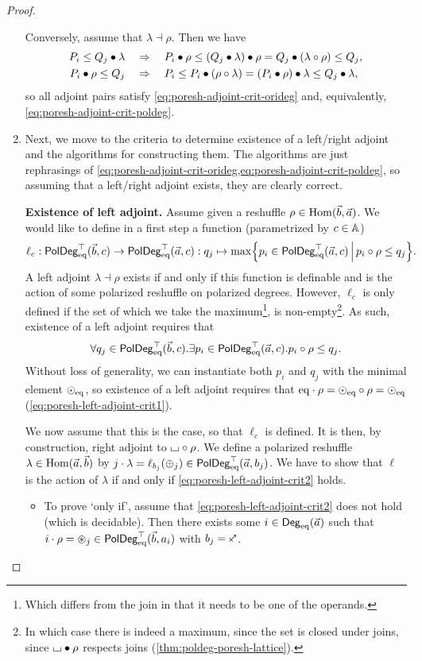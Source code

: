 \documentclass[a4paper]{memoir}
\begin{document}
\begin{proof}
\begin{enumerate}
		Conversely, assume that $\lambda \dashv \rho$. Then we have
		\begin{align*}
			P_i \leq Q_j \mathbin{\bullet} \lambda &\quad\Rightarrow\quad P_i \mathbin{\bullet} \rho \leq (Q_j \mathbin{\bullet} \lambda) \mathbin{\bullet} \rho = Q_j \mathbin{\bullet} (\lambda \circ \rho) \leq Q_j, \\
			P_i \mathbin{\bullet} \rho \leq Q_j &\quad\Rightarrow\quad P_i \leq P_i \mathbin{\bullet} (\rho \circ \lambda) = (P_i \mathbin{\bullet} \rho) \mathbin{\bullet} \lambda \leq Q_j \mathbin{\bullet} \lambda,
		\end{align*}
		so all adjoint pairs satisfy \cref{eq:poresh-adjoint-crit-orideg} and, equivalently, \cref{eq:poresh-adjoint-crit-poldeg}.
		
		\item Next, we move to the criteria to determine existence of a left/right adjoint and the algorithms for constructing them.
		The algorithms are just rephrasings of \cref{eq:poresh-adjoint-crit-orideg,eq:poresh-adjoint-crit-poldeg}, so assuming that a left/right adjoint exists, they are clearly correct.
		
		\textbf{Existence of left adjoint.} Assume given a reshuffle $\rho \in {\mathrm{Hom}}(\vec b, \vec a)$.
		We would like to define in a first step a function (parametrized by $c \in {\mathbb{A}}$)
		\[
			\ell_c : \mathsf{PolDeg}_{\mathrm{eq}}^\top(\vec b, c) \to \mathsf{PolDeg}_{\mathrm{eq}}^\top(\vec a, c) : q_j \mapsto \max \mathopen{}\left\{ p_i \in \mathsf{PolDeg}_{\mathrm{eq}}^\top(\vec a, c) \,\middle|\, p_i \circ \rho \leq q_j \right\}\mathclose{}.
		\]
		A left adjoint $\lambda \dashv \rho$ exists if and only if this function is definable and is the action of some polarized reshuffle on polarized degrees.
		However, $\ell_c$ is only defined if the set of which we take the maximum\footnote{Which differs from the join in that it needs to be one of the operands.}, is non-empty\footnote{In which case there is indeed a maximum, since the set is closed under joins, since ${\llcorner\hspace{-.4ex}\lrcorner} \mathbin{\bullet} \rho$ respects joins (\cref{thm:poldeg-poresh-lattice}).}.
		As such, existence of a left adjoint requires that
		\[
			\forall q_j \in \mathsf{PolDeg}_{\mathrm{eq}}^\top(\vec b, c). \exists p_i \in \mathsf{PolDeg}_{\mathrm{eq}}^\top(\vec a, c).p_i \circ \rho \leq q_j.
		\]
		Without loss of generality, we can instantiate both $p_i$ and $q_j$ with the minimal element ${\odot}_{\mathrm{eq}}$, so existence of a left adjoint requires that ${\mathrm{eq}} \cdot \rho = {\odot}_{\mathrm{eq}} \circ \rho = {\odot}_{\mathrm{eq}}$ (\cref{eq:poresh-left-adjoint-crit1}).
		
		We now assume that this is the case, so that $\ell_c$ is defined.
		It is then, by construction, right adjoint to ${\llcorner\hspace{-.4ex}\lrcorner} \circ \rho$.
		We define a polarized reshuffle $\lambda \in {\mathrm{Hom}}(\vec a, \vec b)$ by $j \cdot \lambda = \ell_{b_j}({\oplus}_j) \in \mathsf{PolDeg}_{\mathrm{eq}}^\top(\vec a, b_j)$.
		We have to show that $\ell$ is the action of $\lambda$ if and only if \cref{eq:poresh-left-adjoint-crit2} holds.
		\begin{itemize}
			\item To prove `only if', assume that \cref{eq:poresh-left-adjoint-crit2} does not hold (which is decidable). Then there exists some $i \in {\mathsf{Deg}_{\mathrm{eq}}}(\vec a)$ such that $i \cdot \rho = {\oast}_j \in \mathsf{PolDeg}_{\mathrm{eq}}^\top(\vec b, a_i)$ with $b_j = \ypolar$.
			

\end{itemize}
\end{enumerate}
\end{proof}
\end{document}
